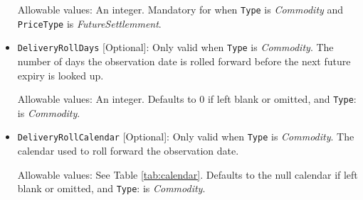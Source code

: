 \begin{itemize}
Allowable values:  An integer. Mandatory for when  \lstinline!Type! is  \emph{Commodity} and \lstinline!PriceType! is \emph{FutureSettlemment}.

\item \lstinline!DeliveryRollDays! [Optional]:
Only valid when  \lstinline!Type! is  \emph{Commodity}.  The number of days the observation date is rolled forward before the
  next future expiry is looked up.
  
Allowable values: An integer. Defaults to 0 if left blank or omitted, and \lstinline!Type!: is  \emph{Commodity}.

\item \lstinline!DeliveryRollCalendar! [Optional]:
Only valid when  \lstinline!Type! is  \emph{Commodity}.  The calendar used to roll forward the observation date.

Allowable values: See Table \ref{tab:calendar}. Defaults to the null calendar if left blank or omitted, and \lstinline!Type!: is  \emph{Commodity}.

\end{itemize}
